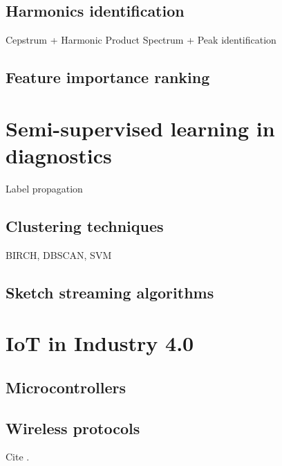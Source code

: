 	\subsection{Harmonics identification}
	Cepstrum + Harmonic Product Spectrum + Peak identification
	
	\subsection{Feature importance ranking}
	
\section{Semi-supervised learning in diagnostics}
	Label propagation	
	
	\subsection{Clustering techniques}
	BIRCH, DBSCAN, SVM
	
	\subsection{Sketch streaming algorithms}
	
\section{IoT in Industry 4.0}

	\subsection{Microcontrollers}

	\subsection{Wireless protocols}

Cite \cite{sample}.